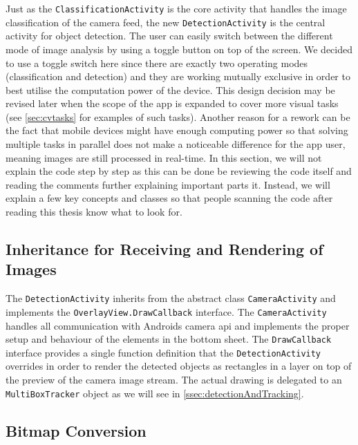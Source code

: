 \documentclass[
			   fontsize=11pt,
               paper=a4,
               bibliography=totoc,
               idxtotoc,
               headsepline,
               footsepline,
               footinclude=false,
               BCOR=12mm,
               DIV=13,
               openany,   %
               ]
               {scrbook}
\newcommand{\code}[1]{\lstinline[basicstyle = \ttfamily\small]{#1}} %
\begin{document}
Just as the \code{ClassificationActivity} is the core activity that handles the image classification of the camera feed, the new \code{DetectionActivity} is the central activity for object detection. The user can easily switch between the different mode of image analysis by using a toggle button on top of the screen. We decided to use a toggle switch here since there are exactly two operating modes (classification and detection) and they are working mutually exclusive in order to best utilise the computation power of the device. This design decision may be revised later when the scope of the app is expanded to cover more visual tasks (see \autoref{sec:cvtasks} for examples of such tasks). Another reason for a rework can be the fact that mobile devices might have enough computing power so that solving multiple tasks in parallel does not make a noticeable difference for the app user, meaning images are still processed in real-time. In this section, we will not explain the code step by step as this can be done be reviewing the code itself and reading the comments further explaining important parts it. Instead, we will explain a few key concepts and classes so that people scanning the code after reading this thesis know what to look for.

\subsection{Inheritance for Receiving and Rendering of Images}

The \code{DetectionActivity} inherits from the abstract class \code{CameraActivity} and implements the \code{OverlayView.DrawCallback} interface. The \code{CameraActivity} handles all communication with Androids camera \gls{api} and implements the proper setup and behaviour of the elements in the bottom sheet. The \code{DrawCallback} interface provides a single function definition that the \code{DetectionActivity} overrides in order to render the detected objects as rectangles in a layer on top of the preview of the camera image stream. The actual drawing is delegated to an \code{MultiBoxTracker} object as we will see in \autoref{ssec:detectionAndTracking}.

\subsection{Bitmap Conversion}
\end{document}
